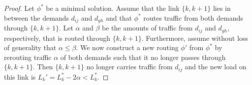 \begin{proof}
	Let $\phi^\ast$ be a minimal solution.
	Assume that the link $\{k, k+1\}$ lies in between the demands $d_{ij}$ and $d_{gh}$ and that $\phi^\ast$ routes traffic from both demands through $\{k, k+1\}$.
	Let $\alpha$ and $\beta$ be the amounts of traffic from $d_{ij}$ and $d_{gh}$, respectively, that is routed through $\{k, k+1\}$.
	Furthermore, assume without loss of generality that $\alpha \leq \beta$.
	We now construct a new routing $\phi'$ from $\phi^\ast$ by rerouting traffic $\alpha$ of both demands such that it no longer passes through $\{k, k+1\}$.
	Then $\{k, k+1\}$ no longer carries traffic from $d_{ij}$ and the new load on this link is $L_k' = L_k^\ast - 2 \alpha < L_k^\ast$.
	
	
	

\end{proof}
